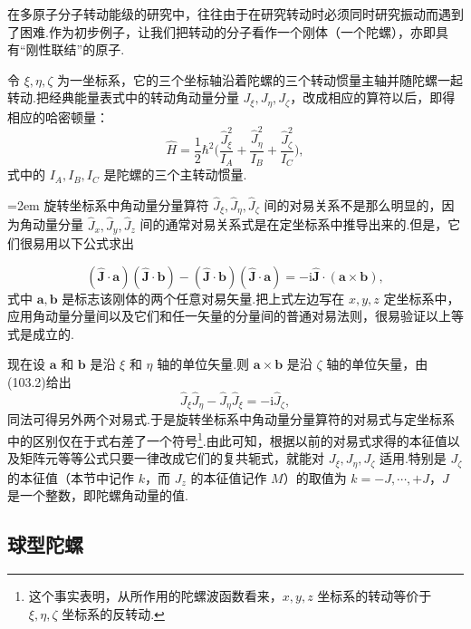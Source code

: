 在多原子分子转动能级的研究中，往往由于在研究转动时必须同时研究振动而遇到了困难.作为初步例子，让我们把转动的分子看作一个刚体（一个陀螺），亦即具有“刚性联结”的原子.

令 $\xi,\eta,\zeta$ 为一坐标系，它的三个坐标轴沿着陀螺的三个转动惯量主轴并随陀螺一起转动.把经典能量表式中的转动角动量分量 $J_\xi,J_\eta,J_\zeta$，改成相应的算符以后，即得相应的哈密顿量：
\begin{equation}
  \hat{H}=\frac{1}{2}\hbar^2\bigg(\frac{\hat{J}_\xi^2}{I_A}
  +\frac{\hat{J}_\eta^2}{I_B}+\frac{\hat{J}_\zeta^2}{I_C}\bigg),
\end{equation}
式中的 $I_A,I_B,I_C$ 是陀螺的三个主转动惯量.

\emergencystretch=2em%
旋转坐标系中角动量分量算符 $\hat{J}_\xi,\hat{J}_\eta,\hat{J}_\zeta$ 间的对易关系不是那么明显的，因为角动量分量 $\hat{J}_x,\hat{J}_y,\hat{J}_z$ 间的通常对易关系式是在定坐标系中推导出来的.但是，它们很易用以下公式求出

\emergencystretch=0pt%

\begin{equation}
  (\hat{\boldsymbol{J}}\cdot\boldsymbol{a})(\hat{\boldsymbol{J}}\cdot\boldsymbol{b})
  -(\hat{\boldsymbol{J}}\cdot\boldsymbol{b})(\hat{\boldsymbol{J}}\cdot\boldsymbol{a})
  =-\mathrm{i}\hat{\boldsymbol{J}}\cdot(\boldsymbol{a}\times\boldsymbol{b}),
\end{equation}
式中 $\boldsymbol{a},\boldsymbol{b}$ 是标志该刚体的两个任意对易矢量.把上式左边写在 $x,y,z$ 定坐标系中，应用角动量分量间以及它们和任一矢量的分量间的普通对易法则，很易验证以上等式是成立的.

现在设 $\boldsymbol{a}$ 和 $\boldsymbol{b}$ 是沿 $\xi$ 和 $\eta$ 轴的单位矢量.则 $\boldsymbol{a}\times\boldsymbol{b}$ 是沿 $\zeta$ 轴的单位矢量，由(103.2)给出
\begin{equation}
  \hat{J}_\xi\hat{J}_\eta-\hat{J}_\eta\hat{J}_\xi=-\mathrm{i}\hat{J}_\zeta,
\end{equation}
同法可得另外两个对易式.于是旋转坐标系中角动量分量算符的对易式与定坐标系中的区别仅在于式右差了一个符号\footnote{这个事实表明，从所作用的陀螺波函数看来，$x,y,z$ 坐标系的转动等价于 $\xi,\eta,\zeta$ 坐标系的反转动.}.由此可知，根据以前的对易式求得的本征值以及矩阵元等等公式只要一律改成它们的复共轭式，就能对 $J_\xi,J_\eta,J_\zeta$ 适用.特别是 $J_\zeta$ 的本征值（本节中记作 $k$，而 $J_z$ 的本征值记作 $M$）的取值为 $k=-J,\cdots,+J$，$J$ 是一个整数，即陀螺角动量的值.

\subsection*{球型陀螺}

